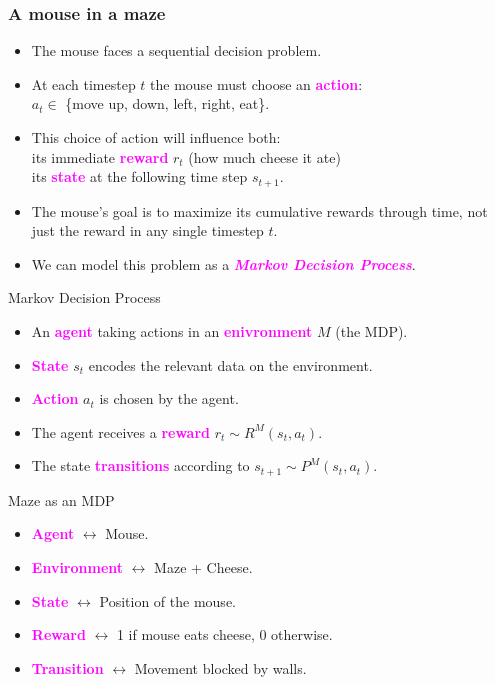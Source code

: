 \documentclass{beamer}
\newlength{\wideitemsep}
\let\olditem\item
\renewcommand{\item}{\setlength{\itemsep}{\wideitemsep}\olditem}
\newcommand{\bspace}{\vspace{3mm}}
\newcommand{\hilite}[1]{\textcolor{magenta}{\textbf{#1}}}
\begin{document}
\begin{frame}
\frametitle{A mouse in a maze}
\begin{itemize}
    \item The mouse faces a sequential decision problem.
    \bspace
    \item At each timestep $t$ the mouse must choose an \hilite{action}: \\
        \hspace{3mm} $a_t \in $ \{move up, down, left, right, eat\}.
    \bspace
    \item This choice of action will influence both: \\
        \hspace{3mm} its immediate \hilite{reward} $r_t$ (how much cheese it ate) \\
        \hspace{3mm} its \hilite{state} at the following time step $s_{t+1}$.
    \bspace
    \item The mouse's goal is to maximize its cumulative rewards through time, not just the reward in any single timestep $t$.
    \bspace
    \item We can model this problem as a \hilite{\emph{Markov Decision Process}}.
\end{itemize}
\end{frame}

\begin{frame}{Markov Decision Process}
\begin{itemize}
    \item An \hilite{agent} taking actions in an \hilite{enivronment} $M$ (the MDP).
    \bspace
    \item \hilite{State} $s_t$ encodes the relevant data on the environment.
    \bspace
    \item \hilite{Action} $a_t$ is chosen by the agent.
    \bspace
    \item The agent receives a \hilite{reward} $r_t \sim R^M(s_t, a_t)$.
    \bspace
    \item The state \hilite{transitions} according to $s_{t+1} \sim P^M(s_t,a_t)$.
\end{itemize}
\end{frame}

\begin{frame}{Maze as an MDP}
\begin{itemize}
    \item \hilite{Agent} $\leftrightarrow$ Mouse.
    \bspace
    \item \hilite{Environment} $\leftrightarrow$ Maze + Cheese.
    \bspace
    \item \hilite{State} $\leftrightarrow$ Position of the mouse.
    \bspace
    \item \hilite{Reward} $\leftrightarrow$ 1 if mouse eats cheese, 0 otherwise.
    \bspace
    \item \hilite{Transition} $\leftrightarrow$ Movement blocked by walls.
\end{itemize}
\end{frame}
\end{document}
